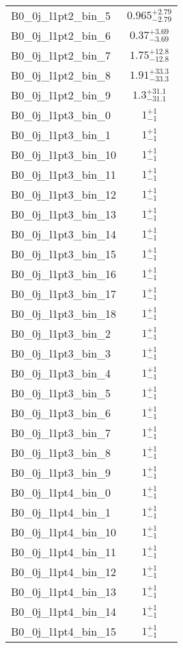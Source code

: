 \begin{tabular}{|l|c|}
B0\_0j\_l1pt2\_bin\_5 & $0.965^{+2.79}_{-2.79}$ \\
B0\_0j\_l1pt2\_bin\_6 & $0.37^{+3.69}_{-3.69}$ \\
B0\_0j\_l1pt2\_bin\_7 & $1.75^{+12.8}_{-12.8}$ \\
B0\_0j\_l1pt2\_bin\_8 & $1.91^{+33.3}_{-33.3}$ \\
B0\_0j\_l1pt2\_bin\_9 & $1.3^{+31.1}_{-31.1}$ \\
B0\_0j\_l1pt3\_bin\_0 & $1^{+1}_{-1}$ \\
B0\_0j\_l1pt3\_bin\_1 & $1^{+1}_{-1}$ \\
B0\_0j\_l1pt3\_bin\_10 & $1^{+1}_{-1}$ \\
B0\_0j\_l1pt3\_bin\_11 & $1^{+1}_{-1}$ \\
B0\_0j\_l1pt3\_bin\_12 & $1^{+1}_{-1}$ \\
B0\_0j\_l1pt3\_bin\_13 & $1^{+1}_{-1}$ \\
B0\_0j\_l1pt3\_bin\_14 & $1^{+1}_{-1}$ \\
B0\_0j\_l1pt3\_bin\_15 & $1^{+1}_{-1}$ \\
B0\_0j\_l1pt3\_bin\_16 & $1^{+1}_{-1}$ \\
B0\_0j\_l1pt3\_bin\_17 & $1^{+1}_{-1}$ \\
B0\_0j\_l1pt3\_bin\_18 & $1^{+1}_{-1}$ \\
B0\_0j\_l1pt3\_bin\_2 & $1^{+1}_{-1}$ \\
B0\_0j\_l1pt3\_bin\_3 & $1^{+1}_{-1}$ \\
B0\_0j\_l1pt3\_bin\_4 & $1^{+1}_{-1}$ \\
B0\_0j\_l1pt3\_bin\_5 & $1^{+1}_{-1}$ \\
B0\_0j\_l1pt3\_bin\_6 & $1^{+1}_{-1}$ \\
B0\_0j\_l1pt3\_bin\_7 & $1^{+1}_{-1}$ \\
B0\_0j\_l1pt3\_bin\_8 & $1^{+1}_{-1}$ \\
B0\_0j\_l1pt3\_bin\_9 & $1^{+1}_{-1}$ \\
B0\_0j\_l1pt4\_bin\_0 & $1^{+1}_{-1}$ \\
B0\_0j\_l1pt4\_bin\_1 & $1^{+1}_{-1}$ \\
B0\_0j\_l1pt4\_bin\_10 & $1^{+1}_{-1}$ \\
B0\_0j\_l1pt4\_bin\_11 & $1^{+1}_{-1}$ \\
B0\_0j\_l1pt4\_bin\_12 & $1^{+1}_{-1}$ \\
B0\_0j\_l1pt4\_bin\_13 & $1^{+1}_{-1}$ \\
B0\_0j\_l1pt4\_bin\_14 & $1^{+1}_{-1}$ \\
B0\_0j\_l1pt4\_bin\_15 & $1^{+1}_{-1}$ \\

\end{tabular}
